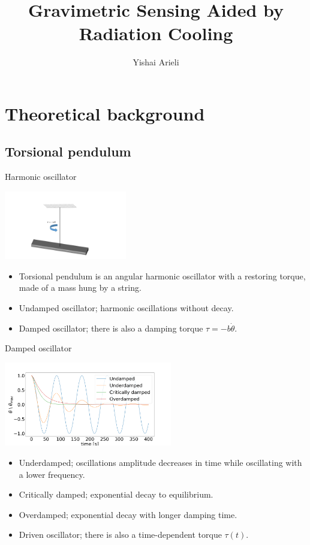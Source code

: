 \documentclass{beamer}
\title[Gravimetric Sensing Aided by Radiation Cooling]{Gravimetric Sensing Aided by Radiation Cooling}
\author[Yishai Arieli]{Yishai Arieli}
\begin{document}
	\typesetFrontSlides

\section{Theoretical background}
\subsection{Torsional pendulum}
\begin{frame}{Harmonic oscillator}
	\begin{center}		
		\includegraphics[width=0.4\textwidth,keepaspectratio]{torsion_pendulum_powerpoint.jpg}
    \end{center}
	\begin{itemize}

		\item Torsional pendulum is an angular harmonic oscillator with a restoring torque, made of a mass hung by a string. 
		\pause
		\item Undamped oscillator; harmonic oscillations without decay.
		\item Damped oscillator; there is also a damping torque $\tau = -b\dot{\theta}$.
		
	\end{itemize}
\end{frame}
\begin{frame}{Damped oscillator}
	\begin{center}		
		\includegraphics[width=0.55\textwidth,keepaspectratio]{damp.png}
    \end{center}
	\begin{itemize}
		
		\item Underdamped; oscillations amplitude decreases in time while oscillating with a lower frequency.
		\item Critically damped; exponential decay to equilibrium.
		\item Overdamped; exponential decay with longer damping time. 
		\pause
		\item Driven oscillator; there is also a time-dependent torque $\tau(t)$.
	\end{itemize}
\end{frame}
\end{document}
